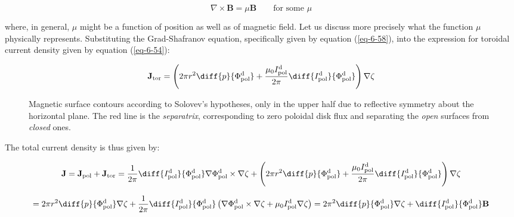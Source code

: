 \begin{equation}
    \label{eq-6-73}
    \nabla\times\mathbf{B}=\mu\mathbf{B}\qquad\text{for some }\mu
\end{equation}

where, in general, $\mu$ might be a function of position as well as of magnetic field. Let us discuss more precisely what the function $\mu$ physically represents. Substituting the Grad-Shafranov equation, specifically given by equation (\ref{eq-6-58}), into the expression for toroidal current density given by equation (\ref{eq-6-54}):

\begin{equation}
    \mathbf{J}_\text{tor}=\left(2\pi r^2\diff{p}{\Phi_\text{pol}^\mathrm{d}}+\frac{\mu_0I_\text{pol}^\mathrm{d}}{2\pi}\diff{I_\text{pol}^\mathrm{d}}{\Phi_\text{pol}^\mathrm{d}}\right)\nabla\zeta
\end{equation}

\begin{figure}[H]
    \centering
    
    \captionsetup{justification=centering}
    \caption{Magnetic surface contours according to Solovev's hypotheses, only in the upper half due to reflective symmetry about the horizontal plane. The red line is the \textit{separatrix}, corresponding to zero poloidal disk flux and separating the \textit{open} surfaces from \textit{closed} ones.}
    \label{fig6-1}
\end{figure}

The total current density is thus given by:

\begin{equation}
    \mathbf{J}=\mathbf{J}_\text{pol}+\mathbf{J}_\text{tor}=\frac{1}{2\pi}\diff{I_\text{pol}^\mathrm{d}}{\Phi_\text{pol}^\mathrm{d}}\nabla\Phi_\text{pol}^\mathrm{d}\times\nabla\zeta+\left(2\pi r^2\diff{p}{\Phi_\text{pol}^\mathrm{d}}+\frac{\mu_0I_\text{pol}^\mathrm{d}}{2\pi}\diff{I_\text{pol}^\mathrm{d}}{\Phi_\text{pol}^\mathrm{d}}\right)\nabla\zeta
\end{equation}

\begin{equation}
    =2\pi r^2\diff{p}{\Phi_\text{pol}^\mathrm{d}}\nabla\zeta+\frac{1}{2\pi}\diff{I_\text{pol}^\mathrm{d}}{\Phi_\text{pol}^\mathrm{d}}\left(\nabla\Phi_\text{pol}^\mathrm{d}\times\nabla\zeta+\mu_0I_\text{pol}^\mathrm{d}\nabla\zeta\right)=2\pi^2\diff{p}{\Phi_\text{pol}^\mathrm{d}}\nabla\zeta+\diff{I_\text{pol}^\mathrm{d}}{\Phi_\text{pol}^\mathrm{d}}\mathbf{B}
\end{equation}

